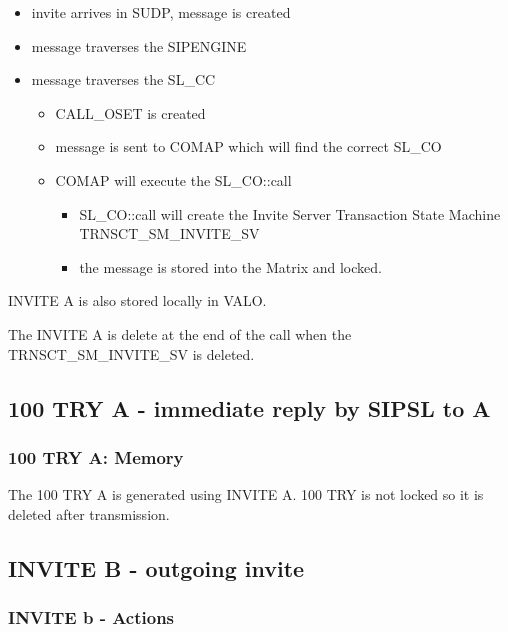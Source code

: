 \documentclass[a4paper]{article}
\begin{document}
\begin {itemize}
\item invite arrives in SUDP, message is created
\item message traverses the SIPENGINE
\item message traverses the SL\_CC
\begin {itemize}
\item CALL\_OSET is created
\item message is sent to COMAP which will find the correct SL\_CO
\item COMAP will execute the SL\_CO::call
\begin {itemize}
\item SL\_CO::call will create the Invite Server Transaction State Machine TRNSCT\_SM\_INVITE\_SV
\item the message is stored into the Matrix and locked.
\end{itemize}
\end{itemize}
\end{itemize}

INVITE A is also stored locally in VALO.

The INVITE A is delete at the end of the call when the TRNSCT\_SM\_INVITE\_SV is deleted.

\subsection{100 TRY A - immediate reply by SIPSL to A}

\subsubsection{100 TRY A: Memory}
The 100 TRY A is generated using INVITE A. 100 TRY is not locked so it is deleted after transmission.

\subsection{INVITE B - outgoing invite}
\subsubsection{INVITE b - Actions}
\end{document}
